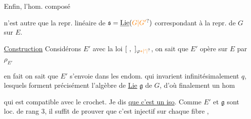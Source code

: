 Enfin, l'hom. composé


n'est autre que la repr. linéaire de $\mathfrak s=\underline{\operatorname{Lie}}(\unsure{G|G'})$ correspondant à la repr.  de $G$ sur $E$.

\uline{Construction} Considérons $E'$ avec la loi $[\ ,\ ]_{\varphi\unsure{*|'|{}}}$, on sait que $E'$ opère sur $E$ par $\rho_{E'}$


en fait on sait que $E'$ s'envoie dans les endom.  qui invarient infinitésimalement $q$,  lesquels forment précisément l'algèbre de \uline{Lie} $\mathfrak g$ de $G$, d'où finalement un hom


qui est compatible avec le crochet. Je dis \uline{que c'est un iso}. Comme $E'$ et $\mathfrak g$ sont  loc.  de rang 3, il suffit de prouver que c'est injectif sur chaque fibre , 

